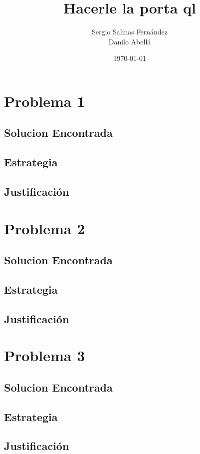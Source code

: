 \documentclass[12pt]{article}
\title{Hacerle la porta ql}								%
\author{Sergio Salinas Fern\'andez \\
Danilo Abellá}								%
\date{\today}											%
\begin{document}
\maketitle


\tableofcontents
\pagebreak



\section{Problema 1}

\subsection{Solucion Encontrada}

\subsection{Estrategia}

\subsection{Justificación}

\section{Problema 2}

\subsection{Solucion Encontrada}

\subsection{Estrategia}

\subsection{Justificación}

\section{Problema 3}

\subsection{Solucion Encontrada}

\subsection{Estrategia}

\subsection{Justificación}
\end{document}
